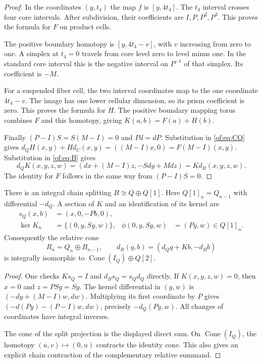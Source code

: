 \begin{proof}
In the coordinates $(y,t_4)$ the map $f$ is $[y,4t_4]$.
The $t_4$ interval crosses four core intervals.
After subdivision, their coefficients are $I,P,P^2,P^3$.
This proves the formula for $F$ on product cells.

The positive boundary homotopy is $[y,4t_4-v]$, with $v$ increasing
from zero to one. A simplex at $t_4=0$ travels from core level zero
to level minus one. In the standard core interval this is the negative
interval on $P^{-1}$ of that simplex. Its coefficient is $-M$.

For a suspended fiber cell, the two interval coordinates map to the one
coordinate $4t_4-v$. The image has one lower cellular dimension, so its
prism coefficient is zero. This proves the formula for $H$.
The positive boundary mapping torus combines $F$ and this homotopy, giving
$K(a,b)=F(a)+H(b)$.

Finally $(P-I)S=S(M-I)=0$ and $Pd=dP$.
Substitution in \eqref{of:eq:CQ} gives
$d_QH(x,y)+Hd_C(x,y)=((M-I)x,0)=F(M-I)(x,y)$.
Substitution in \eqref{of:eq:B} gives
\[
 d_QK(x,y,z,w)=(dx+(M-I)z,-Sdy+Mdz)=Kd_B(x,y,z,w).
\]
The identity for $F$ follows in the same way from $(P-I)S=0$.
\end{proof}

\begin{proposition}\label{of:prop:split}
There is an integral chain splitting $B\cong Q\oplus Q[1]$.
Here $Q[1]_n=Q_{n-1}$ with differential $-d_Q$.
A section of $K$ and an identification of its kernel are
\begin{equation}\label{of:eq:split}
 \begin{aligned}
 s_Q(x,b)&=(x,0,-Pb,0),\\
 \ker K_n&=\{(0,y,Sy,w)\},&
 \phi(0,y,Sy,w)&=(Py,w)\in Q[1]_n.
 \end{aligned}
\end{equation}
Consequently the relative cone
\[
 R_n=Q_n\oplus B_{n-1},\qquad d_R(q,b)=(d_Qq+Kb,-d_Bb)
\]
is integrally isomorphic to $\operatorname{Cone}(I_Q)\oplus Q[2]$.
\end{proposition}

\begin{proof}
One checks $Ks_Q=I$ and $d_Bs_Q=s_Qd_Q$ directly.
If $K(x,y,z,w)=0$, then $x=0$ and $z=PSy=Sy$.
The kernel differential in $(y,w)$ is
$(-dy+(M-I)w,dw)$.
Multiplying its first coordinate by $P$ gives
$(-d(Py)-(P-I)w,dw)$, precisely $-d_Q(Py,w)$.
All changes of coordinates have integral inverses.

The cone of the split projection is the displayed direct sum.
On $\operatorname{Cone}(I_Q)$, the homotopy $(u,v)\mapsto(0,u)$
contracts the identity cone. This also gives an explicit chain contraction
of the complementary relative summand.
\end{proof}

